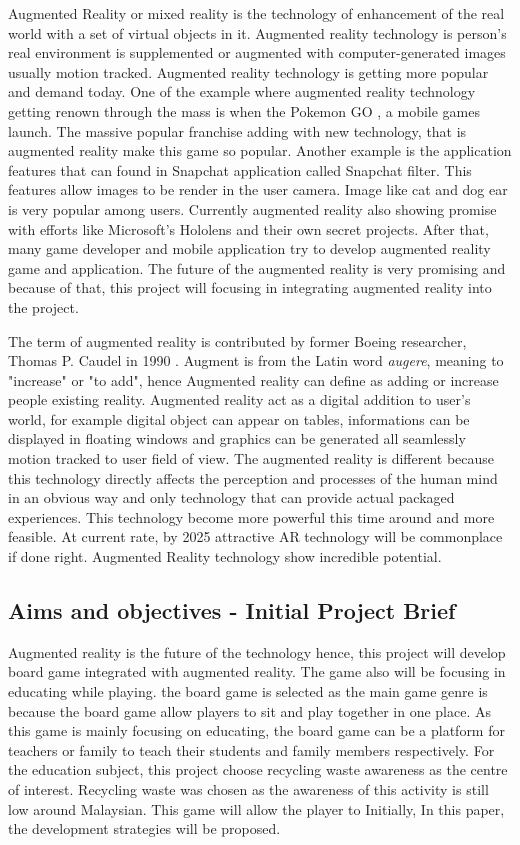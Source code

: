 \documentclass[12pt]{article}
\begin{document}
Augmented Reality or mixed reality is the technology of enhancement of the real world with a set of virtual objects in it. Augmented reality technology is person's real environment is supplemented or augmented with computer-generated images usually motion tracked. Augmented reality technology is getting more popular and demand today. One of the example where augmented reality technology getting renown through the mass is when  the Pokemon GO \cite{PokemonGo}, a mobile games launch. The massive popular franchise adding with new technology, that is augmented reality make this game so popular. Another example is the application features that can found in Snapchat application called Snapchat filter. This features allow images to be render in the user camera. Image like cat and dog ear is very popular among users. Currently augmented reality also showing promise with efforts like Microsoft's Hololens and their own secret projects. After that, many game developer and mobile application try to develop augmented reality game and application. The future of the augmented reality is very promising and because of that, this project will focusing in integrating augmented reality into the project. 

\par 

The term of augmented reality is contributed by former Boeing researcher, Thomas P. Caudel in 1990 \cite{lee2012augmented}. Augment is from the Latin word \textit{augere}, meaning to "increase" or "to add", hence Augmented reality can define as adding or increase people existing reality. Augmented reality act as a digital addition to user's world, for example digital object can appear on tables, informations can be displayed in floating windows and graphics can be generated all seamlessly motion tracked to user field of view. The augmented reality is different because this technology directly affects the perception and processes of the human mind in an obvious way and only technology that can provide actual packaged experiences. This technology become more powerful this time around and more feasible. At current rate, by 2025 attractive AR technology will be commonplace if done right. Augmented Reality technology show incredible potential.


\subsection{Aims and objectives - Initial Project Brief}

Augmented reality is the future of the technology hence, this project will develop board game integrated with augmented reality. The game also will be focusing in educating while playing. the board game is selected as the main game genre is because the board game allow players to sit and play together in one place. As this game is mainly focusing on educating, the board game can be a platform for teachers or family to teach their students and family members respectively. For the education subject, this project choose recycling waste awareness as the centre of interest. Recycling waste was chosen as the awareness of this activity is still low around Malaysian. This game will allow the player to Initially, In this paper, the development strategies will be proposed.
\end{document}
